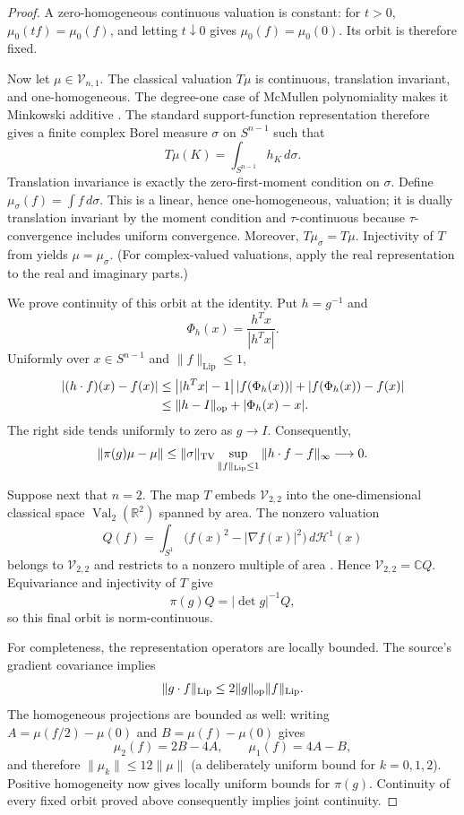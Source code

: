 \documentclass[11pt]{article}
\newcommand{\Lip}{\operatorname{Lip}}
\newcommand{\Val}{\operatorname{Val}}
\begin{document}
\begin{proof}
A zero-homogeneous continuous valuation is constant: for $t>0$,
$\mu_0(tf)=\mu_0(f)$, and letting $t\downarrow0$ gives
$\mu_0(f)=\mu_0(0)$.  Its orbit is therefore fixed.

Now let $\mu\in\mathcal V_{n,1}$.  The classical valuation $T\mu$ is
continuous, translation invariant, and one-homogeneous.  The degree-one case
of McMullen polynomiality makes it Minkowski additive \cite{McMullen,Ludwig}.
The standard support-function representation therefore gives a finite complex
Borel measure $\sigma$ on $S^{n-1}$ such that
\[
 T\mu(K)=\int_{S^{n-1}}h_K\,d\sigma.
\]
Translation invariance is exactly the zero-first-moment condition on
$\sigma$.  Define $\mu_\sigma(f)=\int f\,d\sigma$.  This is a linear, hence
one-homogeneous, valuation; it is dually translation invariant by the moment
condition and $\tau$-continuous because $\tau$-convergence includes uniform
convergence.  Moreover, $T\mu_\sigma=T\mu$.  Injectivity of $T$ from
\cite[Proposition~4.4]{CKP} yields $\mu=\mu_\sigma$.  (For complex-valued
valuations, apply the real representation to the real and imaginary parts.)

We prove continuity of this orbit at the identity.  Put $h=g^{-1}$ and
\[
 \Phi_h(x)=\frac{h^Tx}{|h^Tx|}.
\]
Uniformly over $x\in S^{n-1}$ and $\|f\|_{\Lip}\leq1$,
\begin{align*}
 |(h\mathbin{\cdot}f)(x)-f(x)|
 &\leq \big||h^Tx|-1\big|\,|f(\Phi_h(x))|
       +|f(\Phi_h(x))-f(x)|\\
 &\leq \|h-I\|_{\rm op}+|\Phi_h(x)-x|.
\end{align*}
The right side tends uniformly to zero as $g\to I$.  Consequently,
\[
 \|\pi(g)\mu-\mu\|
 \leq \|\sigma\|_{\rm TV}
 \sup_{\|f\|_{\Lip}\leq1}\|h\mathbin{\cdot}f-f\|_\infty
 \longrightarrow0.
\]

Suppose next that $n=2$.  The map $T$ embeds
$\mathcal V_{2,2}$ into the one-dimensional classical space
$\Val_2(\mathbb R^2)$ spanned by area.  The nonzero valuation
\[
 Q(f)=\int_{S^1}\big(f(x)^2-|\nabla f(x)|^2\big)\,d\mathcal H^1(x)
\]
belongs to $\mathcal V_{2,2}$ and restricts to a nonzero multiple of area
\cite{CPTV,CKP}.  Hence $\mathcal V_{2,2}=\mathbb C Q$.  Equivariance and
injectivity of $T$ give
\[
 \pi(g)Q=|\det g|^{-1}Q,
\]
so this final orbit is norm-continuous.

For completeness, the representation operators are locally bounded.  The
source's gradient covariance implies
\[
 \|g\mathbin{\cdot}f\|_{\Lip}
 \leq2\|g\|_{\rm op}\|f\|_{\Lip}.
\]
The homogeneous projections are bounded as well: writing
$A=\mu(f/2)-\mu(0)$ and $B=\mu(f)-\mu(0)$ gives
\[
\mu_2(f)=2B-4A,\qquad \mu_1(f)=4A-B,
\]
and therefore $\|\mu_k\|\leq12\|\mu\|$ (a deliberately uniform bound for
$k=0,1,2$).  Positive homogeneity now gives
locally uniform bounds for $\pi(g)$.  Continuity of every fixed orbit proved
above consequently implies joint continuity.
\end{proof}
\end{document}
